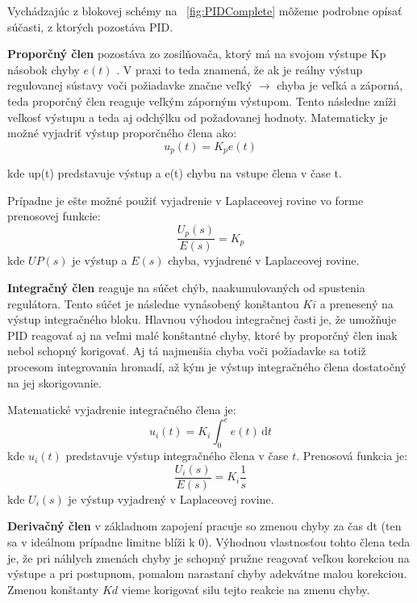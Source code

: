 Vychádzajúc z blokovej schémy na \figurename~\ref{fig:PIDComplete} môžeme podrobne opísať súčasti, z ktorých pozostáva \ac{PID}.

\textbf {Proporčný člen} pozostáva zo zosilňovača, ktorý má na svojom výstupe Kp násobok chyby $e(t)$ . V praxi to teda znamená, že ak je reálny výstup regulovanej sústavy voči požiadavke značne veľký $\rightarrow$ chyba je veľká a záporná, teda proporčný člen reaguje veľkým záporným výstupom. Tento následne zníži veľkosť výstupu a teda aj odchýlku od požadovanej hodnoty. Matematicky je možné vyjadriť výstup proporčného člena ako:
\begin{equation}
u_p (t)= K_p e( t )
\end{equation}

kde up(t) predstavuje výstup a e(t) chybu na vstupe člena v čase t. 

Prípadne je ešte možné použiť vyjadrenie v Laplaceovej rovine vo forme prenosovej funkcie:
\begin{equation}
\dfrac {U_p(s)} {E(s)} = K_p 
\end{equation}
kde $UP(s)$ je výstup a $E(s)$ chyba, vyjadrené v Laplaceovej rovine.

\textbf{Integračný člen} reaguje na súčet chýb, naakumulovaných od spustenia regulátora. Tento súčet je následne vynásobený konštantou $Ki$ a prenesený na výstup integračného bloku. Hlavnou výhodou integračnej časti je, že umožňuje \ac{PID} reagovať aj na veľmi malé konštantné chyby, ktoré by proporčný člen inak nebol schopný korigovať. Aj tá najmenšia chyba voči požiadavke sa totiž procesom integrovania hromadí, až kým je výstup integračného člena dostatočný na jej skorigovanie. 

Matematické vyjadrenie integračného člena je:
\begin{equation}
u_i (t)= K_i \int_0^e \! e( t ) \, \mathrm{d}t 
\end{equation}
kde $u_i(t)$ predstavuje výstup integračného člena v čase $t$. 
Prenosová funkcia je:
\begin{equation}
\dfrac{U_i(s)}{E(s)}  = K_i\dfrac{ 1}{s} 
\end{equation}
kde $U_i (s)$ je výstup vyjadrený v Laplaceovej rovine.

\textbf{Derivačný člen} v základnom zapojení pracuje so zmenou chyby za čas dt (ten sa v ideálnom prípadne limitne blíži k 0). Výhodnou vlastnosťou tohto člena teda je, že pri náhlych zmenách chyby je schopný pružne reagovať veľkou korekciou na výstupe a pri postupnom, pomalom narastaní chyby adekvátne malou korekciou. Zmenou konštanty $Kd$ vieme korigovať silu tejto reakcie na zmenu chyby.

